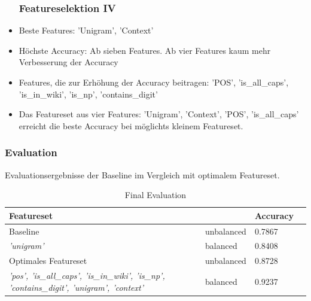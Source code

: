 \documentclass{beamer}
\begin{document}
	\begin{frame}
		\begin{itemize}
			\frametitle{Featureselektion IV}
			\item <+->Beste Features: 'Unigram', 'Context'\\
			\item <+->Höchste Accuracy: Ab sieben Features. Ab vier Features kaum mehr Verbesserung der Accuracy \\
			\item <+->Features, die zur Erhöhung der Accuracy beitragen: 'POS', 'is\_all\_caps', 'is\_in\_wiki', 'is\_np', 'contains\_digit'\\
			\item <+->Das Featureset aus vier Features: 'Unigram', 'Context', 'POS', 'is\_all\_caps' erreicht die beste Accuracy bei möglichts kleinem Featureset.
		\end{itemize}
	\end{frame}
	\begin{frame}
		\frametitle{Evaluation}
		Evaluationsergebnisse der Baseline im Vergleich mit optimalem Featureset.
				\begin{table}
					\centering
					\caption{Final Evaluation}

					\begin{tabular}{llll}
						Featureset & & Accuracy\\
						\toprule
						Baseline & unbalanced & 0.7867\\
						\tiny\color{blue}\textit{'unigram'} & balanced & 0.8408\\
						Optimales Featureset	 & unbalanced & 0.8728\\
						\tiny\color{blue}\textit{'pos', 'is\_all\_caps', 'is\_in\_wiki', 'is\_np', 'contains\_digit', 'unigram', 'context'}		 & balanced & 0.9237\\
						\bottomrule
					\end{tabular}
					\label{tab:allf2}
				\end{table}
	\end{frame}
\end{document}
